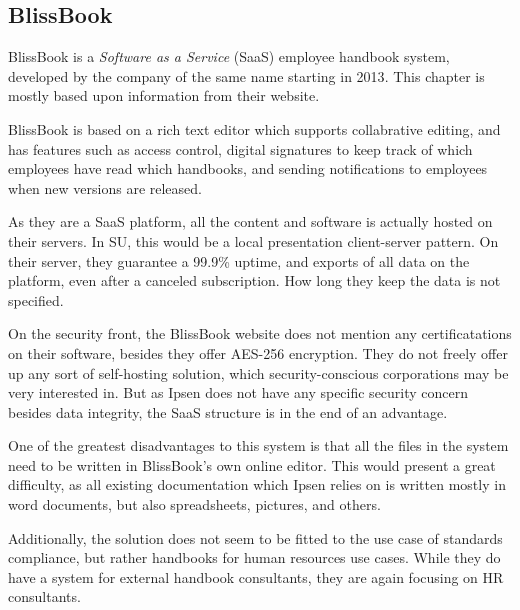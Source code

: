 \subsection{BlissBook}
BlissBook is a \textit{Software as a Service} (SaaS) employee handbook system, developed by the company of the same name starting in 2013\cite{BlissbookInfo}.
This chapter is mostly based upon information from their website\cite{BlissbookContents}.

BlissBook is based on a rich text editor which supports collabrative editing, and has features such as access control, digital signatures to keep track of which employees have read which handbooks, and sending notifications to employees when new versions are released.

As they are a SaaS platform, all the content and software is actually hosted on their servers.
In SU, this would be a local presentation client-server pattern. %
On their server, they guarantee a 99.9\% uptime, and exports of all data on the platform, even after a canceled subscription.
How long they keep the data is not specified.

On the security front, the BlissBook website does not mention any certificatations on their software, besides they offer AES-256 encryption.\cite{BlissbookSecurity}
They do not freely offer up any sort of self-hosting solution, which security-conscious corporations may be very interested in.
But as Ipsen does not have any specific security concern besides data integrity, the SaaS structure is in the end of an advantage.

One of the greatest disadvantages to this system is that all the files in the system need to be written in BlissBook's own online editor.
This would present a great difficulty, as all existing documentation which Ipsen relies on is written mostly in word documents, but also spreadsheets, pictures, and others.

Additionally, the solution does not seem to be fitted to the use case of standards compliance, but rather handbooks for human resources use cases.
While they do have a system for external handbook consultants, they are again focusing on HR consultants.\cite{BlissbookHandbook}
